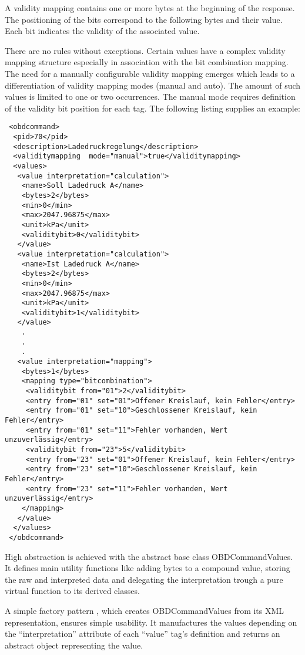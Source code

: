 A validity mapping contains one or more bytes at the beginning of the response. The positioning of the bits correspond to the following bytes and 
their value. Each bit indicates the validity of the associated value.

There are no rules without exceptions. Certain values have a complex validity mapping structure especially in association with the bit 
combination mapping. The need for a manually configurable validity mapping emerges which leads to a differentiation of validity mapping 
modes (manual and auto). The amount of such values is limited to one or two occurrences. The manual mode requires definition of the validity bit position
for each tag. The following listing supplies an example:

\begin{verbatim}
 <obdcommand>
  <pid>70</pid>
  <description>Ladedruckregelung</description>
  <validitymapping  mode="manual">true</validitymapping>
  <values>
   <value interpretation="calculation">
    <name>Soll Ladedruck A</name>
    <bytes>2</bytes>
    <min>0</min>
    <max>2047.96875</max>
    <unit>kPa</unit>
    <validitybit>0</validitybit>    
   </value>
   <value interpretation="calculation">
    <name>Ist Ladedruck A</name>
    <bytes>2</bytes>
    <min>0</min>
    <max>2047.96875</max>
    <unit>kPa</unit>    
    <validitybit>1</validitybit>            
   </value>
    .
    .
    .
   <value interpretation="mapping">
    <bytes>1</bytes>
    <mapping type="bitcombination">
     <validitybit from="01">2</validitybit>
     <entry from="01" set="01">Offener Kreislauf, kein Fehler</entry>
     <entry from="01" set="10">Geschlossener Kreislauf, kein Fehler</entry>
     <entry from="01" set="11">Fehler vorhanden, Wert unzuverlässig</entry>
     <validitybit from="23">5</validitybit>
     <entry from="23" set="01">Offener Kreislauf, kein Fehler</entry>
     <entry from="23" set="10">Geschlossener Kreislauf, kein Fehler</entry>
     <entry from="23" set="11">Fehler vorhanden, Wert unzuverlässig</entry>
    </mapping>        
   </value>
  </values>
 </obdcommand>
\end{verbatim}

High abstraction is achieved with the abstract base class OBDCommandValues. It defines main utility functions like adding bytes to a compound value, storing the 
raw and interpreted data and delegating the interpretation trough a pure virtual function to its derived classes. 

A simple factory pattern \cite{PATTERN}, which creates OBDCommandValues from its XML representation, ensures simple usability. It manufactures the values depending on 
the ``interpretation'' attribute of each ``value'' tag's definition and returns an abstract object representing the value. 

